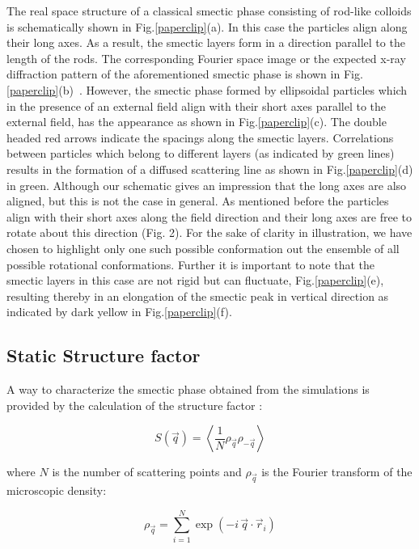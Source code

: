 \documentclass[aip,graphicx]{revtex4-1}
\begin{document}
The real space structure of a classical smectic phase consisting of rod-like colloids is schematically shown in Fig.\ref{paperclip}(a). In this case the particles align along their long axes. As a result, the smectic layers form in a direction parallel to the length of the rods. The corresponding Fourier space image or the expected x-ray diffraction pattern of the aforementioned smectic phase is shown in Fig.\ref{paperclip}(b)~\cite{kuijk2012phase, byelov2013situ}. However, the smectic phase formed by ellipsoidal particles which in the presence of an external field align with their short axes parallel to the external field, has the appearance as shown in Fig.\ref{paperclip}(c). The double headed red arrows indicate the spacings along the smectic layers. Correlations between particles which belong to different layers (as indicated by green lines) results in the formation of a diffused scattering line as shown in Fig.\ref{paperclip}(d) in green. Although our schematic gives an impression that the long axes are also aligned, but this is not the case in general. As mentioned before the particles align with their short axes along the field direction and their long axes are free to rotate about this direction (Fig. 2). For the sake of clarity in illustration, we have chosen to highlight only one such possible conformation out the ensemble of all possible rotational conformations. Further it is important to note that the smectic layers in this case are not rigid but can fluctuate, Fig.\ref{paperclip}(e), resulting thereby in an elongation of the smectic peak in vertical direction as indicated by dark yellow in Fig.\ref{paperclip}(f).


\subsection{Static Structure factor}

A way to characterize the smectic phase obtained from the simulations is provided by the calculation of the structure factor \cite{Hansen_McDonald}:

\begin{equation}\label{eq:S_q}
    S( \vec{q} ) = \left\langle \frac{1}{N} \rho_{\vec{q}} \rho_{-\vec{q}} \right\rangle 
\end{equation}

where $N$ is the number of scattering points and $\rho_{\vec{q}}$ is the Fourier transform of the microscopic density:

\begin{equation}
    \rho_{\vec{q}} = \sum_{i=1}^N \exp(-i\, \vec{q} \cdot \vec{r}_i)
\end{equation}
\end{document}
